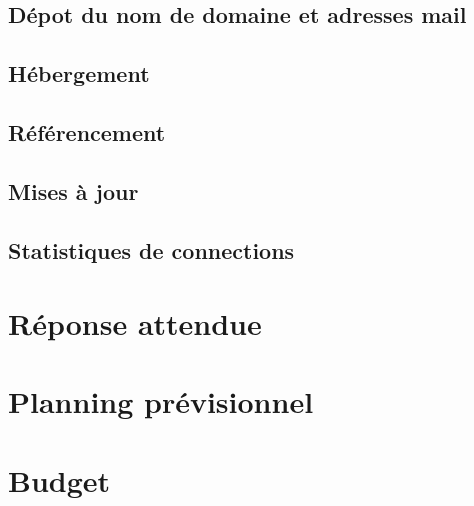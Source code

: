 \documentclass[oneside]{report}
\begin{document}
{		\section{Dépot du nom de domaine et adresses mail}
		\section{Hébergement}
		\section{Référencement}
		\section{Mises à jour}
		\section{Statistiques de connections}
	}

	\chapter{Réponse attendue}
	{
	
	}

	\chapter{Planning prévisionnel}
	{
	
	}

	\chapter{Budget}
	{
		
	}
\end{document}

